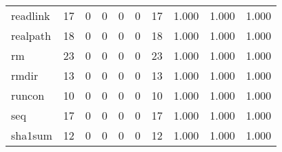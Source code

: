 \begin{longtable}{lp{1.3cm}p{1.3cm}p{1.3cm}p{1.3cm}p{1.3cm}p{1.3cm}p{1.3cm}p{1.3cm}p{1.3cm}}
readlink  &                     17 &                                             0 &                                            0 &                                           0 &                                            0 &                                         17 &                                1.000 &                                  1.000 &                                1.000 \\
realpath  &                     18 &                                             0 &                                            0 &                                           0 &                                            0 &                                         18 &                                1.000 &                                  1.000 &                                1.000 \\
rm        &                     23 &                                             0 &                                            0 &                                           0 &                                            0 &                                         23 &                                1.000 &                                  1.000 &                                1.000 \\
rmdir     &                     13 &                                             0 &                                            0 &                                           0 &                                            0 &                                         13 &                                1.000 &                                  1.000 &                                1.000 \\
runcon    &                     10 &                                             0 &                                            0 &                                           0 &                                            0 &                                         10 &                                1.000 &                                  1.000 &                                1.000 \\
seq       &                     17 &                                             0 &                                            0 &                                           0 &                                            0 &                                         17 &                                1.000 &                                  1.000 &                                1.000 \\
sha1sum   &                     12 &                                             0 &                                            0 &                                           0 &                                            0 &                                         12 &                                1.000 &                                  1.000 &                                1.000 \\

\end{longtable}
